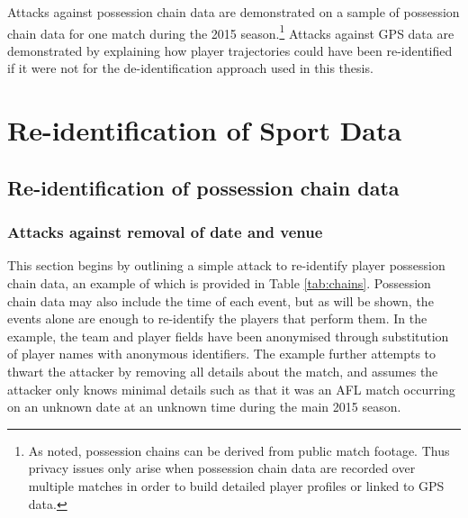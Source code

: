 Attacks against possession chain data are demonstrated on a sample of possession chain data for one match during the 2015 season.\footnote{As noted, possession chains can be derived from public match footage. Thus privacy issues only arise when possession chain data are recorded over multiple matches in order to build detailed player profiles or linked to GPS data.} Attacks against GPS data are demonstrated by explaining how player trajectories could have been re-identified if it were not for the de-identification approach used in this thesis.

\section{Re-identification of Sport Data}
\label{sec:de-identification-methods}

\subsection{Re-identification of possession chain data}
\label{sec:de-identification-methods-possession-chain}


\subsubsection{Attacks against removal of date and venue}
\label{sec:de-identification-methods-possession-chain-venue}

This section begins by outlining a simple attack to re-identify player possession chain data, an example of which is provided in Table \ref{tab:chains}. Possession chain data may also include the time of each event, but as will be shown, the events alone are enough to re-identify the players that perform them. In the example, the team and player fields have been anonymised through substitution of player names with anonymous identifiers. The example further attempts to thwart the attacker by removing all details about the match, and assumes the attacker only knows minimal details such as that it was an AFL match occurring on an unknown date at an unknown time during the main 2015 season.

